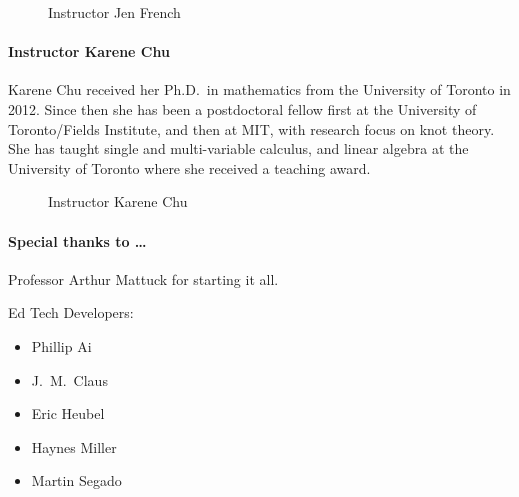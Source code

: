 \documentclass[pdftex, brazil, 12pt, twoside]{article}
\begin{document}
\begin{figure}[H]
  \begin{center}
    \caption{Instructor Jen French }
    \label{fig:jen}
  \end{center}
\end{figure}

\paragraph{Instructor Karene Chu}
Karene Chu received her Ph.D.\ in mathematics from the University of Toronto in 2012.
Since then she has been a postdoctoral fellow first at the University of Toronto/Fields
Institute, and then at MIT, with research focus on knot theory. She has taught single
and multi-variable calculus, and linear algebra at the University of Toronto where
she received a teaching award.

\begin{figure}[H]
  \begin{center}
    \caption{Instructor Karene Chu}
    \label{fig:wang}
  \end{center}
\end{figure}

\paragraph{Special thanks to \ldots}
Professor Arthur Mattuck for starting it all.

Ed Tech Developers:
\begin{itemize}[noitemsep]
\item Phillip Ai
\item J.\ M.\ Claus
\item Eric Heubel
\item Haynes Miller
\item Martin Segado
\end{itemize}
\end{document}
